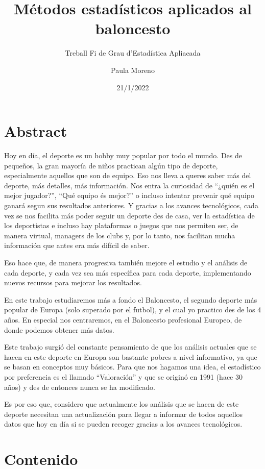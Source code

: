 \documentclass[
]{article}
\title{Métodos estadísticos aplicados al baloncesto}
\subtitle{Treball Fi de Grau d'Estadística Apliacada}
\author{Paula Moreno}
\date{21/1/2022}
\begin{document}
\maketitle

\hypertarget{abstract}{%
\section{Abstract}\label{abstract}}

Hoy en día, el deporte es un hobby muy popular por todo el mundo. Des de
pequeños, la gran mayoría de niños practican algún tipo de deporte,
especialmente aquellos que son de equipo. Eso nos lleva a queres saber
más del deporte, más detalles, más información. Nos entra la curiosidad
de ``¿quién es el mejor jugador?'', ``Qué equipo és mejor?'' o incluso
intentar prevenir qué equipo ganará segun sus resultados anteriores. Y
gracias a los avances tecnológicos, cada vez se nos facilita más poder
seguir un deporte des de casa, ver la estadística de los deportistas e
incluso hay plataformas o juegos que nos permiten ser, de manera
virtual, managers de los clubs y, por lo tanto, nos facilitan mucha
información que antes era más difícil de saber.

Eso hace que, de manera progresiva también mejore el estudio y el
análisis de cada deporte, y cada vez sea más específica para cada
deporte, implementando nuevos recursos para mejorar los resultados.

En este trabajo estudiaremos más a fondo el Baloncesto, el segundo
deporte más popular de Europa (solo superado por el futbol), y el cual
yo practico des de los 4 años. En especial nos centraremos, en el
Baloncesto profesional Europeo, de donde podemos obtener más datos.

Este trabajo surgió del constante pensamiento de que los análisis
actuales que se hacen en este deporte en Europa son bastante pobres a
nivel informativo, ya que se basan en conceptos muy básicos. Para que
nos hagamos una idea, el estadístico por preferencia es el llamado
``Valoración'' y que se originó en 1991 (hace 30 años) y des de entonces
nunca se ha modificado.

Es por eso que, considero que actualmente los análisis que se hacen de
este deporte necesitan una actualización para llegar a informar de todos
aquellos datos que hoy en día si se pueden recoger gracias a los avances
tecnológicos.

\hypertarget{contenido}{%
\section{Contenido}\label{contenido}}
\end{document}
